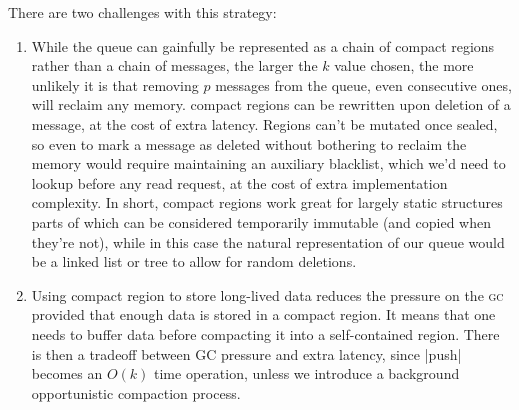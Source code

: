 \documentclass[11pt]{article}
\begin{document}
There are two challenges with this strategy:
\begin{enumerate}
\item While the queue can gainfully be represented as a chain of
  compact regions rather than a chain of messages, the larger the $k$
  value chosen, the more unlikely it is that removing $p$ messages
  from the queue, even consecutive ones, will reclaim any memory.
  compact regions can be rewritten upon deletion of a message, at the
  cost of extra latency. Regions can't be mutated once sealed, so even
  to mark a message as deleted without bothering to reclaim the memory
  would require maintaining an auxiliary blacklist, which we'd need to
  lookup before any read request, at the cost of extra implementation
  complexity. In short, compact regions work great for largely static
  structures parts of which can be considered temporarily immutable
  (and copied when they're not), while in this case the natural
  representation of our queue would be a linked list or tree to allow
  for random deletions.
\item Using compact region to store long-lived data reduces the
  pressure on the \textsc{gc} provided that enough data is stored in
  a compact region. It means that one needs to buffer data before
  compacting it into a self-contained region. There is then a tradeoff
  between GC pressure and extra latency, since |push| becomes an
  $O(k)$ time operation, unless we introduce a background
  opportunistic compaction process.
\end{enumerate}
\end{document}
